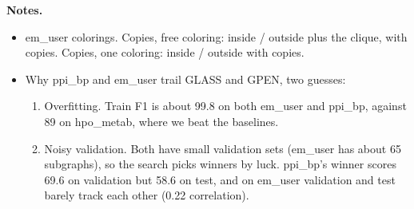 \documentclass[11pt]{article}
\begin{document}
\textbf{Notes.}
\begin{itemize}
  \item em\_user colorings. Copies, free coloring: inside / outside plus the clique, with copies.
        Copies, one coloring: inside / outside with copies.
  \item Why ppi\_bp and em\_user trail GLASS and GPEN, two guesses:
  \begin{enumerate}
    \item Overfitting. Train F1 is about 99.8 on both em\_user and ppi\_bp, against 89 on
          hpo\_metab, where we beat the baselines.
    \item Noisy validation. Both have small validation sets (em\_user has about 65 subgraphs),
          so the search picks winners by luck. ppi\_bp's winner scores 69.6 on validation but
          58.6 on test, and on em\_user validation and test barely track each other (0.22
          correlation).
  \end{enumerate}
\end{itemize}
\end{document}
